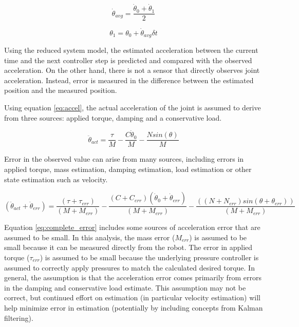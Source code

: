 \begin{equation}
\dot{\theta}_{avg} = \dfrac{\dot{\theta}_{0} + \dot{\theta}_{1}}{2}
\end{equation}

\begin{equation}
\theta_{1} = \theta_{0} + \dot{\theta}_{avg} \delta t
\end{equation}

Using the reduced system model, the estimated acceleration between the current time and the next controller 
step is predicted and compared with the observed acceleration. On the other hand,
there is not a sensor that directly observes joint acceleration. Instead, error
is measured in the difference between the estimated position and the measured 
position.


Using equation \ref{eq:accel}, the actual acceleration of the joint is assumed to derive from three sources: applied torque, damping and a conservative load.

\begin{equation}
\ddot{\theta}_{act} = \dfrac{\tau}{M} - \dfrac{C \dot{\theta}_{0}}{M} - \dfrac{N sin \left(\theta \right)}{M}
\end{equation}

Error in the observed value can arise from many sources, including errors in applied torque, mass estimation, damping estimation, load estimation or other state estimation such as velocity.

\begin{equation} \label{eq:complete_error}
(\ddot{\theta}_{act} + \ddot{\theta}_{err}) = \dfrac{(\tau + \tau_{err})}{(M + M_{err})} - \dfrac{(C + C_{err}) (\dot{\theta}_{0} + \dot{\theta}_{err})}{(M + M_{err})} - \dfrac{((N + N_{err})sin(\theta + \theta_{err}))}{(M + M_{err})}
\end{equation}

Equation \ref{eq:complete_error} includes some sources of acceleration error that are assumed to be small. In 
this analysis, the mass error ($M_{err}$) is assumed to be small because it can
be measured directly from the robot. The error in applied torque ($\tau_{err}$) is assumed to be small because
the underlying pressure controller is assumed to correctly apply pressures to
match the calculated desired torque. In general, the assumption is that the acceleration error
comes primarily from errors in the damping and conservative load estimate. This 
assumption may not be correct, but continued effort on estimation (in particular 
velocity estimation) will help minimize error in estimation (potentially by 
including concepts from Kalman filtering).

